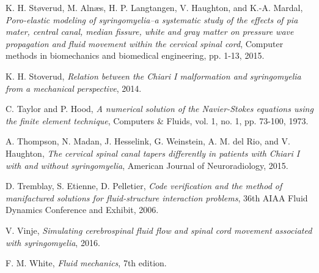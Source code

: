 \documentclass[a4paper,11pt,openright,twoside]{book}
\begin{document}
\begin{thebibliography}{100}
 K. H. Støverud, M. Alnæs, H. P. Langtangen, V. Haughton, and K.-A. Mardal, \emph{Poro-elastic modeling of syringomyelia–a systematic study of the effects of pia mater, central canal, median fissure, white and gray matter on pressure wave propagation and fluid movement within the cervical spinal cord}, Computer methods in biomechanics and biomedical engineering, pp. 1-13, 2015.

 K. H. Stoverud, \emph{Relation between the Chiari I malformation and syringomyelia from a mechanical perspective}, 2014.

 C. Taylor and P. Hood, \emph{A numerical solution of the Navier-Stokes equations using the finite element technique}, Computers \& Fluids, vol. 1, no. 1, pp. 73-100, 1973.

 A. Thompson, N. Madan, J. Hesselink, G. Weinstein, A. M. del Rio, and V. Haughton, \emph{The cervical spinal canal tapers differently in patients with Chiari I with and without syringomyelia}, American Journal of Neuroradiology, 2015.

 D. Tremblay, S. Etienne, D. Pelletier, \emph{Code verification and the method of manifactured solutions for fluid-structure interaction problems}, 36th AIAA Fluid Dynamics Conference and Exhibit, 2006.

 V. Vinje, \emph{Simulating cerebrospinal fluid flow and spinal cord movement associated with syringomyelia}, 2016.

 F. M. White, \emph{Fluid mechanics}, 7th edition.


\end{thebibliography}
\end{document}
